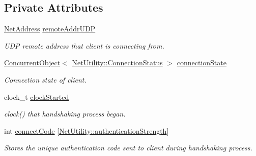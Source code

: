 \subsection*{Private Attributes}
\begin{DoxyCompactItemize}
\item 
\hypertarget{class_net_server_client_a1bde2a0e9fd43f581b65434ec12c3c6e}{
\hyperlink{class_net_address}{NetAddress} \hyperlink{class_net_server_client_a1bde2a0e9fd43f581b65434ec12c3c6e}{remoteAddrUDP}}
\label{class_net_server_client_a1bde2a0e9fd43f581b65434ec12c3c6e}

\begin{DoxyCompactList}\small\item\em UDP remote address that client is connecting from. \item\end{DoxyCompactList}\item 
\hypertarget{class_net_server_client_a7cf5767e011097703711ca704caba13d}{
\hyperlink{class_concurrent_object}{ConcurrentObject}$<$ \hyperlink{class_net_utility_a7eae52138f8bd597ffc67ebf07e86b6d}{NetUtility::ConnectionStatus} $>$ \hyperlink{class_net_server_client_a7cf5767e011097703711ca704caba13d}{connectionState}}
\label{class_net_server_client_a7cf5767e011097703711ca704caba13d}

\begin{DoxyCompactList}\small\item\em Connection state of client. \item\end{DoxyCompactList}\item 
clock\_\-t \hyperlink{class_net_server_client_af7cf5f0a7c11223afb74fde89b9d0424}{clockStarted}
\begin{DoxyCompactList}\small\item\em clock() that handshaking process began. \item\end{DoxyCompactList}\item 
int \hyperlink{class_net_server_client_a8a0157c321e8659bf67047824ee35202}{connectCode} \mbox{[}\hyperlink{class_net_utility_a0cd69698eb7cf26f31f71848699e7fd7}{NetUtility::authenticationStrength}\mbox{]}
\begin{DoxyCompactList}\small\item\em Stores the unique authentication code sent to client during handshaking process. \item\end{DoxyCompactList}\end{DoxyCompactItemize}


